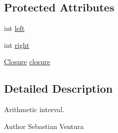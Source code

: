 \subsection*{Protected Attributes}
\begin{DoxyCompactItemize}
\item 
int \hyperlink{classnet_1_1sf_1_1jclec_1_1util_1_1intset_1_1_interval_a716d96af76f70841d335e5c00919ae3c}{left}
\item 
int \hyperlink{classnet_1_1sf_1_1jclec_1_1util_1_1intset_1_1_interval_a01975c7f117b8f791551b9eaa7ba23c0}{right}
\item 
\hyperlink{enumnet_1_1sf_1_1jclec_1_1util_1_1intset_1_1_closure}{Closure} \hyperlink{classnet_1_1sf_1_1jclec_1_1util_1_1intset_1_1_interval_a82dbbcc9c60e4a4fed3df192dee33e4a}{closure}
\end{DoxyCompactItemize}


\subsection{Detailed Description}
Arithmetic interval.

\begin{DoxyAuthor}{Author}
Sebastian Ventura 
\end{DoxyAuthor}


